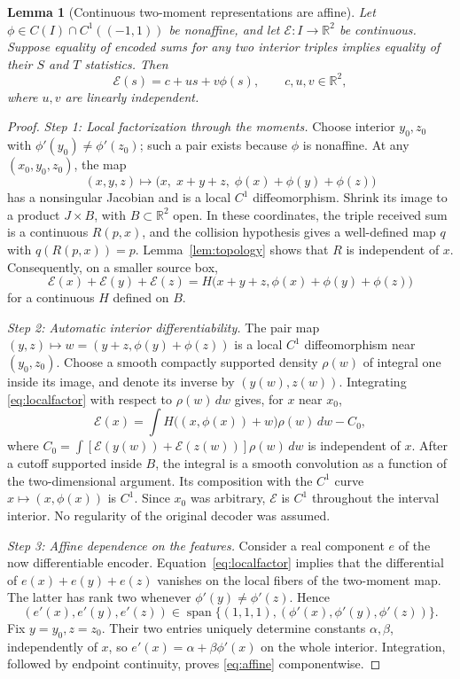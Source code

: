 \documentclass[11pt,letterpaper]{article}
\newtheorem{lemma}[theorem]{Lemma}
\theoremstyle{remark}
\newcommand{\enc}{\mathscr E}
\newcommand{\R}{\mathbb R}
\begin{document}
\begin{lemma}[Continuous two-moment representations are affine]
\label{lem:affine}
Let $\phi\in C(I)\cap C^1((-1,1))$ be nonaffine, and let $\enc:I\to\R^2$ be continuous. Suppose equality of encoded sums for any two interior triples implies equality of their $S$ and $T$ statistics. Then
\begin{equation}
 \enc(s)=c+u s+v\phi(s),
 \qquad c,u,v\in\R^2,
 \label{eq:affine}
\end{equation}
where $u,v$ are linearly independent.
\end{lemma}
\begin{proof}
\emph{Step 1: Local factorization through the moments.}
Choose interior $y_0,z_0$ with $\phi'(y_0)\ne\phi'(z_0)$; such a pair exists because $\phi$ is nonaffine. At any $(x_0,y_0,z_0)$, the map
$$
 (x,y,z)\longmapsto
 \bigl(x,\;x+y+z,\;\phi(x)+\phi(y)+\phi(z)\bigr)
$$
has a nonsingular Jacobian and is a local $C^1$ diffeomorphism. Shrink its image to a product $J\times B$, with $B\subset\R^2$ open. In these coordinates, the triple received sum is a continuous $R(p,x)$, and the collision hypothesis gives a well-defined map $q$ with $q(R(p,x))=p$. Lemma~\ref{lem:topology} shows that $R$ is independent of $x$. Consequently, on a smaller source box,
\begin{equation}
 \enc(x)+\enc(y)+\enc(z)
 =H\bigl(x+y+z,\phi(x)+\phi(y)+\phi(z)\bigr)
 \label{eq:localfactor}
\end{equation}
for a continuous $H$ defined on $B$.

\emph{Step 2: Automatic interior differentiability.}
The pair map $(y,z)\mapsto w=(y+z,\phi(y)+\phi(z))$ is a local $C^1$ diffeomorphism near $(y_0,z_0)$. Choose a smooth compactly supported density $\rho(w)$ of integral one inside its image, and denote its inverse by $(y(w),z(w))$. Integrating \eqref{eq:localfactor} with respect to $\rho(w)\,dw$ gives, for $x$ near $x_0$,
$$
 \enc(x)=\int H\bigl((x,\phi(x))+w\bigr)\rho(w)\,dw-C_0,
$$
where $C_0=\int[\enc(y(w))+\enc(z(w))]\rho(w)\,dw$ is independent of $x$. After a cutoff supported inside $B$, the integral is a smooth convolution as a function of the two-dimensional argument. Its composition with the $C^1$ curve $x\mapsto(x,\phi(x))$ is $C^1$. Since $x_0$ was arbitrary, $\enc$ is $C^1$ throughout the interval interior. No regularity of the original decoder was assumed.

\emph{Step 3: Affine dependence on the features.}
Consider a real component $e$ of the now differentiable encoder. Equation~\eqref{eq:localfactor} implies that the differential of $e(x)+e(y)+e(z)$ vanishes on the local fibers of the two-moment map. The latter has rank two whenever $\phi'(y)\ne\phi'(z)$. Hence
$$
 (e'(x),e'(y),e'(z))
 \in\operatorname{span}\{(1,1,1),(\phi'(x),\phi'(y),\phi'(z))\}.
$$
Fix $y=y_0,z=z_0$. Their two entries uniquely determine constants $\alpha,\beta$, independently of $x$, so $e'(x)=\alpha+\beta\phi'(x)$ on the whole interior. Integration, followed by endpoint continuity, proves \eqref{eq:affine} componentwise.


\end{proof}
\end{document}
